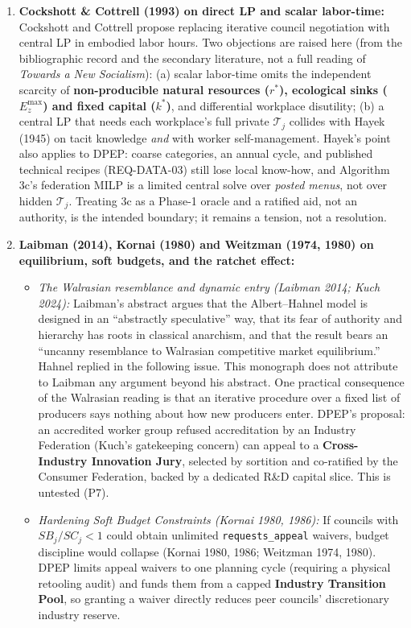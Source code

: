 \documentclass[10pt,twoside,openany]{book}
\theoremstyle{dpepstyle}
\begin{document}
\begin{enumerate}[leftmargin=1.8em,itemsep=3pt]
  \item \textbf{Cockshott \& Cottrell (1993) on direct LP and scalar labor-time:} Cockshott and Cottrell propose replacing iterative council negotiation with central LP in embodied labor hours. Two objections are raised here (from the bibliographic record and the secondary literature, not a full reading of \emph{Towards a New Socialism}): (a) scalar labor-time omits the independent scarcity of \textbf{non-producible natural resources ($r^*$), ecological sinks ($E_z^{\max}$) and fixed capital ($k^*$)}, and differential workplace disutility; (b) a central LP that needs each workplace's full private $\mathcal{T}_j$ collides with Hayek (1945) on tacit knowledge \emph{and} with worker self-management. Hayek's point also applies to DPEP: coarse categories, an annual cycle, and published technical recipes (REQ-DATA-03) still lose local know-how, and Algorithm 3c's federation MILP is a limited central solve over \emph{posted menus}, not over hidden $\mathcal{T}_j$. Treating 3c as a Phase-1 oracle and a ratified aid, not an authority, is the intended boundary; it remains a tension, not a resolution.
  \item \textbf{Laibman (2014), Kornai (1980) and Weitzman (1974, 1980) on equilibrium, soft budgets, and the ratchet effect:}
  \begin{itemize}[leftmargin=1.4em,itemsep=1pt]
    \item \emph{The Walrasian resemblance and dynamic entry (Laibman 2014; Kuch 2024):} Laibman's abstract argues that the Albert--Hahnel model is designed in an ``abstractly speculative'' way, that its fear of authority and hierarchy has roots in classical anarchism, and that the result bears an ``uncanny resemblance to Walrasian competitive market equilibrium.'' Hahnel replied in the following issue. This monograph does not attribute to Laibman any argument beyond his abstract. One practical consequence of the Walrasian reading is that an iterative procedure over a fixed list of producers says nothing about how new producers enter. DPEP's proposal: an accredited worker group refused accreditation by an Industry Federation (Kuch's gatekeeping concern) can appeal to a \textbf{Cross-Industry Innovation Jury}, selected by sortition and co-ratified by the Consumer Federation, backed by a dedicated R\&D capital slice. This is untested (P7).
    \item \emph{Hardening Soft Budget Constraints (Kornai 1980, 1986):} If councils with $SB_j/SC_j < 1$ could obtain unlimited \texttt{requests\_appeal} waivers, budget discipline would collapse (Kornai 1980, 1986; Weitzman 1974, 1980). DPEP limits appeal waivers to one planning cycle (requiring a physical retooling audit) and funds them from a capped \textbf{Industry Transition Pool}, so granting a waiver directly reduces peer councils' discretionary industry reserve.

\end{itemize}
\end{enumerate}
\end{document}
